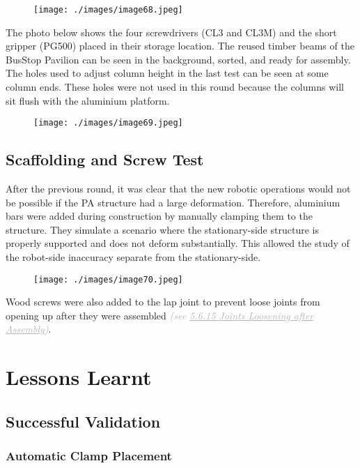 \begin{figure}[H]
\texttt{[image: ./images/image68.jpeg]}
\end{figure}


The photo below shows the four screwdrivers (CL3 and CL3M) and the short gripper (PG500) placed in their storage location. The reused timber beams of the BusStop Pavilion can be seen in the background, sorted, and ready for assembly. The holes used to adjust column height in the last test can be seen at some column ends. These holes were not used in this round because the columns will sit flush with the aluminium platform.

\begin{figure}[H]
\texttt{[image: ./images/image69.jpeg]}
\end{figure}


\subsection{Scaffolding and Screw Test}

After the previous round, it was clear that the new robotic operations would not be possible if the PA structure had a large deformation. Therefore, aluminium bars were added during construction by manually clamping them to the structure. They simulate a scenario where the stationary-side structure is properly supported and does not deform substantially. This allowed the study of the robot-side inaccuracy separate from the stationary-side.

\begin{figure}[H]
\texttt{[image: ./images/image70.jpeg]}
\end{figure}


Wood screws were also added to the lap joint to prevent loose joints from opening up after they were assembled \textit{\textcolor[HTML]{B7B7B7}{(see \uline{5.6.15 Joints Loosening after Assembly})}}. 

\section{Lessons Learnt}

\subsection{Successful Validation}

\subsubsection{Automatic Clamp Placement}

